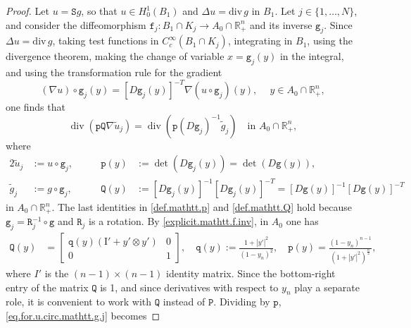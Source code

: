 \documentclass[10pt,reqno,a4paper]{article}
\numberwithin{equation}{section}
\theoremstyle{plain}
\theoremstyle{definition}
\newcommand{\R}{{\mathbb R}}
\renewcommand{\div}{\mathrm{div}\,}
\newcommand{\grad}{\nabla}
\DeclareMathOperator{\divergence}{div}
\begin{document}
\begin{proof}
Let $u = \mathtt S g$,   
so that $u \in H^1_0(B_1)$ and $\Delta u = \div g$ in $B_1$. 
Let $j \in \{1, \ldots, N\}$, and consider the diffeomorphism 
$\mathtt f_j : B_1 \cap K_j \to A_0 \cap \R^n_+$ 
and its inverse $\mathtt g_j$. 
Since $\Delta u = \div g$, 
taking test functions in $C^{\infty}_c(B_1 \cap K_j)$, 
integrating in $B_1$, using the divergence theorem, 
making the change of variable $x = \mathtt g_j(y)$ in the integral, 
and using the transformation rule for the gradient
\begin{equation} \label{trans.rule.grad}
(\grad u) \circ \mathtt g_j (y) = [D \mathtt g_j(y)]^{-T} \grad( u \circ \mathtt g_j)(y), 
\quad \ y \in A_0 \cap \R^n_+,
\end{equation}
one finds that 
\begin{equation} \label{eq.for.u.circ.mathtt.g.j}
\divergence (\mathtt p \mathtt Q \grad \tilde u_j) 
= \divergence (\mathtt p (D \mathtt g_j)^{-1} \tilde g_j) 
\quad \text{in } A_0 \cap \R^n_+,
\end{equation}
where 
\begin{alignat}{2} 
\tilde u_j & := u \circ \mathtt g_j, \qquad & 
\mathtt p(y) & := \det (D \mathtt g_j(y)) = \det (D \mathtt g(y)), 
\label{def.mathtt.p}
\\
\tilde g_j & := g \circ \mathtt g_j, \qquad & 
\mathtt Q(y) & := [D \mathtt g_j(y)]^{-1} [D \mathtt g_j(y)]^{-T} 
= [D \mathtt g(y)]^{-1} [D \mathtt g(y)]^{-T}
\label{def.mathtt.Q}
\end{alignat}
in $A_0 \cap \R^n_+$. 
The last identities in \eqref{def.mathtt.p} and \eqref{def.mathtt.Q}
hold because $\mathtt g_j = \mathtt R_j^{-1} \circ \mathtt g$ 
and $\mathtt R_j$ is a rotation. 
By \eqref{explicit.mathtt.f.inv}, in $A_0$ one has 
\begin{align}
\label{una.buona.volta}
\mathtt Q(y) & = \begin{bmatrix} 
\mathtt q(y) (\mathrm{I'} + y' \otimes y')  & 0 \\
0 & 1 \end{bmatrix}\!\!,
\quad
\mathtt q(y) := \frac{1+|y'|^2}{(1-y_n)^2},
\quad  
\mathtt p(y) = \frac{ (1-y_n)^{n-1} }{ (1 + |y'|^2)^{\frac{n}{2}} },
\end{align}
where $I'$ is the $(n-1) \times (n-1)$ identity matrix. 
Since the bottom-right entry of the matrix $\mathtt Q$ is 1, 
and since derivatives with respect to $y_n$ play a separate role, 
it is convenient to work with $\mathtt Q$ instead of $\mathtt P$. 
Dividing by $\mathtt p$, \eqref{eq.for.u.circ.mathtt.g.j} becomes 

\end{proof}
\end{document}
